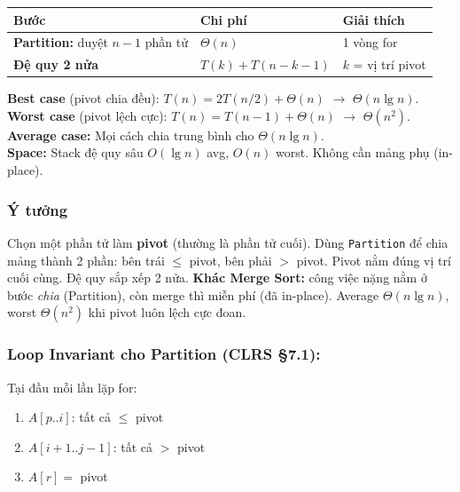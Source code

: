 \documentclass[10pt]{article}
\providecommand{\tightlist}{\setlength{\itemsep}{0pt}\setlength{\parskip}{0pt}}
\begin{document}
\begin{tcolorbox}[colback=yellow!5, colframe=orange!50, boxrule=0.5pt, arc=2pt, title={\small\textbf{Phân tích Complexity -- Quick Sort}}]
\begin{tabular}{|l|l|l|}
\hline
\textbf{Bước} & \textbf{Chi phí} & \textbf{Giải thích} \\
\hline
\textbf{Partition:} duyệt $n-1$ phần tử & $\Theta(n)$ & 1 vòng for \\
\hline
\textbf{Đệ quy 2 nửa} & $T(k) + T(n-k-1)$ & $k$ = vị trí pivot \\
\hline
\end{tabular}
\vspace{0.2cm}

\textbf{Best case} (pivot chia đều): $T(n)=2T(n/2)+\Theta(n)$ $\to$ $\Theta(n\lg n)$.\\
\textbf{Worst case} (pivot lệch cực): $T(n)=T(n-1)+\Theta(n)$ $\to$ $\Theta(n^2)$.\\
\textbf{Average case:} Mọi cách chia trung bình cho $\Theta(n\lg n)$.\\
\textbf{Space:} Stack đệ quy sâu $O(\lg n)$ avg, $O(n)$ worst. Không cần mảng phụ (in-place).
\end{tcolorbox}

\subsubsection{Ý tưởng}
Chọn một phần tử làm \textbf{pivot} (thường là phần tử cuối). Dùng \texttt{Partition} để chia mảng thành 2 phần: bên trái $\leq$ pivot, bên phải $>$ pivot. Pivot nằm đúng vị trí cuối cùng. Đệ quy sắp xếp 2 nửa. \textbf{Khác Merge Sort:} công việc nặng nằm ở bước \textit{chia} (Partition), còn merge thì miễn phí (đã in-place). Average $\Theta(n \lg n)$, worst $\Theta(n^2)$ khi pivot luôn lệch cực đoan.

\subsubsection{\texorpdfstring{Loop Invariant cho Partition (CLRS
\S 7.1):}{Loop Invariant cho Partition (CLRS 7.1):}}\label{loop-invariant-cho-partition-clrs-7.1}

Tại đầu mỗi lần lặp for:

\begin{enumerate}
\def\labelenumi{\arabic{enumi}.}
\tightlist
\item
  \(A[p..i]\): tất cả \(\leq\) pivot
\item
  \(A[i+1..j-1]\): tất cả \(>\) pivot
\item
  \(A[r] =\) pivot
\end{enumerate}
\end{document}
